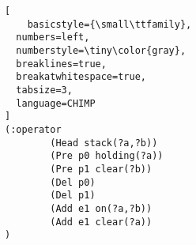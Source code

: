 \begin{lstlisting}[
    basicstyle={\small\ttfamily},
  numbers=left,
  numberstyle=\tiny\color{gray},
  breaklines=true,
  breakatwhitespace=true,
  tabsize=3,
  language=CHIMP
]
(:operator
        (Head stack(?a,?b))
        (Pre p0 holding(?a))
        (Pre p1 clear(?b)) 
        (Del p0)
        (Del p1)
        (Add e1 on(?a,?b))
        (Add e1 clear(?a))
)
\end{lstlisting}